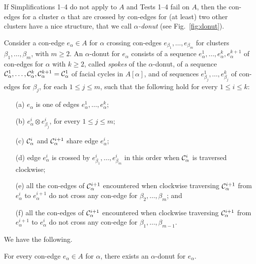 \documentclass[letter,runningheads]{llncs}
\newcommand{\conf}{\otimes}
\begin{document}
If {\sc Simplifications 1--4} do not apply to $A$ and {\sc Tests 1--4} fail on $A$, then the con-edges for a cluster $\alpha$ that are crossed by con-edges for (at least) two other clusters have a nice structure, that we call {\em $\alpha$-donut} (see Fig.~\ref{fig:donut}). 

Consider a con-edge $e_{\alpha}\in A$ for $\alpha$ crossing con-edges $e_{\beta_1},\dots,e_{\beta_m}$ for clusters $\beta_1,\dots,\beta_m$, with $m\geq 2$. An $\alpha$-donut for $e_{\alpha}$ consists of a sequence $e^1_\alpha,\dots,e^{k}_\alpha,e^{k+1}_\alpha$ of con-edges for $\alpha$ with $k\geq 2$, called {\em spokes} of the $\alpha$-donut, of a sequence ${\cal C}^1_\alpha,\dots,{\cal C}^{k}_\alpha,{\cal C}^{k+1}_\alpha={\cal C}^{1}_\alpha$ of facial cycles in $A[\alpha]$, and of sequences $e^1_{\beta_j},\dots,e^k_{\beta_j}$ of con-edges for $\beta_j$, for each $1\leq j\leq m$, such that the following hold for every $1\leq i\leq k$: 

\begin{itemize}
\item[(a)] $e_{\alpha}$ is one of edges $e^1_\alpha,\dots,e^{k}_\alpha$;
\item[(b)] $e^i_\alpha\conf e^i_{\beta_j}$, for every $1\leq j\leq m$;
\item[(c)] ${\cal C}^i_\alpha$ and ${\cal C}^{i+1}_\alpha$ share edge $e^i_\alpha$;
\item[(d)] edge $e^i_{\alpha}$ is crossed by $e^i_{\beta_1},\dots,e^i_{\beta_m}$ in this order when ${\cal C}^i_{\alpha}$ is traversed clockwise;
\item[(e)] all the con-edges of ${\cal C}^{i+1}_{\alpha}$ encountered when clockwise traversing ${\cal C}^{i+1}_{\alpha}$ from $e^{i}_{\alpha}$ to $e^{i+1}_{\alpha}$ do not cross any con-edge for $\beta_2,\dots,\beta_m$; and
\item[(f)] all the con-edges of ${\cal C}^{i+1}_{\alpha}$ encountered when clockwise traversing ${\cal C}^{i+1}_{\alpha}$ from $e^{i+1}_{\alpha}$ to $e^{i}_{\alpha}$ do not cross any con-edge for $\beta_1,\dots,\beta_{m-1}$. 
\end{itemize}

We have the following.

\begin{lemma} \label{le:donut}
For every con-edge $e_{\alpha}\in A$ for $\alpha$, there exists an $\alpha$-donut for $e_{\alpha}$.
\end{lemma}
\end{document}
